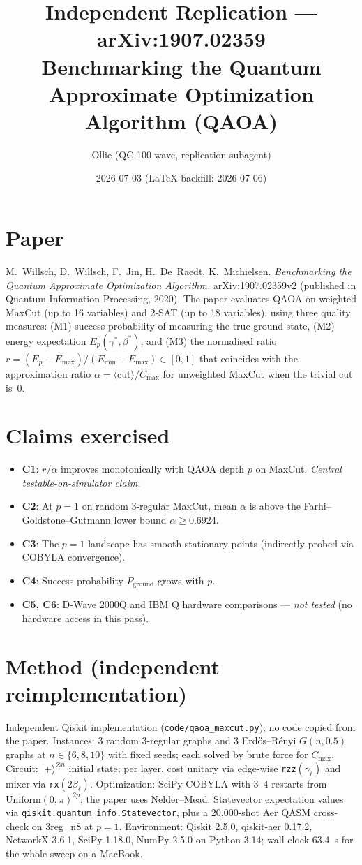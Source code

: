 \documentclass[11pt]{article}
\title{Independent Replication --- arXiv:1907.02359 \\ \large Benchmarking the Quantum Approximate Optimization Algorithm (QAOA)}
\author{Ollie (QC-100 wave, replication subagent)}
\date{2026-07-03 (LaTeX backfill: 2026-07-06)}
\begin{document}
\maketitle

\section{Paper}
M.~Willsch, D.~Willsch, F.~Jin, H.~De~Raedt, K.~Michielsen. \emph{Benchmarking the Quantum Approximate Optimization Algorithm.} arXiv:1907.02359v2 (published in Quantum Information Processing, 2020). The paper evaluates QAOA on weighted MaxCut (up to 16 variables) and 2-SAT (up to 18 variables), using three quality measures: (M1) success probability of measuring the true ground state, (M2) energy expectation $E_p(\gamma^\ast,\beta^\ast)$, and (M3) the normalised ratio $r=(E_p-E_{\max})/(E_{\min}-E_{\max})\in[0,1]$ that coincides with the approximation ratio $\alpha=\langle\text{cut}\rangle/C_{\max}$ for unweighted MaxCut when the trivial cut is~0.

\section{Claims exercised}
\begin{itemize}
  \item \textbf{C1}: $r/\alpha$ improves monotonically with QAOA depth $p$ on MaxCut. \emph{Central testable-on-simulator claim.}
  \item \textbf{C2}: At $p=1$ on random 3-regular MaxCut, mean $\alpha$ is above the Farhi--Goldstone--Gutmann lower bound $\alpha\ge 0.6924$.
  \item \textbf{C3}: The $p=1$ landscape has smooth stationary points (indirectly probed via COBYLA convergence).
  \item \textbf{C4}: Success probability $P_{\text{ground}}$ grows with $p$.
  \item \textbf{C5, C6}: D-Wave 2000Q and IBM Q hardware comparisons --- \emph{not tested} (no hardware access in this pass).
\end{itemize}

\section{Method (independent reimplementation)}
Independent Qiskit implementation (\texttt{code/qaoa\_maxcut.py}); no code copied from the paper.
Instances: 3 random 3-regular graphs and 3 Erd\H{o}s--R\'enyi $G(n,0.5)$ graphs at $n\in\{6,8,10\}$ with fixed seeds; each solved by brute force for $C_{\max}$.
Circuit: $\lvert +\rangle^{\otimes n}$ initial state; per layer, cost unitary via edge-wise \texttt{rzz}$(\gamma_\ell)$ and mixer via \texttt{rx}$(2\beta_\ell)$.
Optimization: SciPy COBYLA with 3--4 restarts from $\text{Uniform}(0,\pi)^{2p}$; the paper uses Nelder--Mead. Statevector expectation values via \texttt{qiskit.quantum\_info.Statevector}, plus a 20{,}000-shot Aer QASM cross-check on 3reg\_n8 at $p=1$.
Environment: Qiskit 2.5.0, qiskit-aer 0.17.2, NetworkX 3.6.1, SciPy 1.18.0, NumPy 2.5.0 on Python 3.14; wall-clock 63.4~s for the whole sweep on a MacBook.
\end{document}
